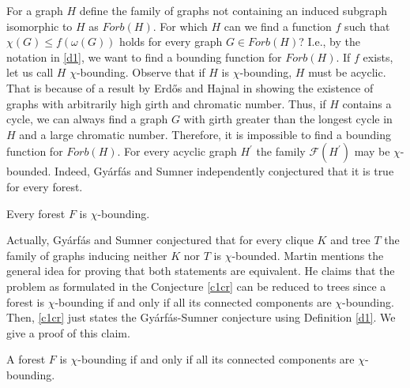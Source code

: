 For a graph $H$ define the family of graphs not containing an induced subgraph isomorphic to $H$ as $\textit{Forb}(H)$. For which $H$ can we find a function $f$ such that $\chi (G)\leq f(\omega (G))$ holds for every graph $G\in\textit{Forb}(H)$? I.e., by the notation in \ref{d1}, we want to find a bounding function for $\textit{Forb}(H)$. If $f$ exists, let us call $H$ $\chi $-bounding. Observe that if $H$ is $\chi $-bounding, $H$ must be acyclic. That is because of a result by Erd\H{o}s and Hajnal in \cite{EH66} showing the existence of graphs with arbitrarily high girth and chromatic number. Thus, if $H$ contains a cycle, we can always find a graph $G$ with girth greater than the longest cycle in $H$ and a large chromatic number. Therefore, it is impossible to find a bounding function for $\textit{Forb}(H)$. For every acyclic graph $H^\prime$ the family $\mathcal{F}(H^\prime )$ may be $\chi$-bounded. Indeed, Gyárfás \cite{Gy75} and Sumner \cite{Su81} independently conjectured that it is true for every forest.

\begin{con}\label{c1cr}
Every forest $F$ is $\chi$-bounding.
\end{con}

Actually, Gyárfás and Sumner conjectured that for every clique $K$ and tree $T$ the family of graphs inducing neither $K$ nor $T$ is $\chi$-bounded. Martin \cite{Ma16} mentions the general idea for proving that both statements are equivalent. He claims that the problem as formulated in the Conjecture \ref{c1cr} can be reduced to trees since a forest is $\chi$-bounding if and only if all its connected components are $\chi$-bounding. Then, \ref{c1cr} just states the Gyárfás-Sumner conjecture using Definition \ref{d1}. We give a proof of this claim.

\begin{thm}
A forest $F$ is $\chi$-bounding if and only if all its connected components are $\chi$-bounding.
\end{thm}

